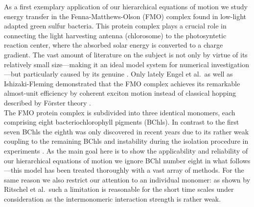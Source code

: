 As a first exemplary application of our hierarchical equations of motion we study energy transfer in the Fenna-Matthews-Olson (FMO) complex found in low-light adapted green sulfur bacteria.
This protein complex plays a crucial role in connecting the light harvesting antenna (chlorosome) to the photosyntetic reaction center, where the absorbed solar energy is converted to a charge gradient.
The vast amount of literature on the subject is not only by virtue of its relatively small size---making it an ideal model system for numerical investigation---but particularly caused by its genuine .
Only lately Engel et al.\ as well as Ishizaki-Fleming demonstrated that the FMO complex achieves its remarkable almost-unit efficiency by coherent exciton motion instead of classical hopping described by Förster theory \cite{EnCaRe07_fmo,IsFl09_fmo}. \\



The FMO protein complex is subdivided into three identical monomers, each comprising eight bacteriochlorophyll pigments (BChls).
In contrast to the first seven BChls the eighth was only discovered in recent years due to its rather weak coupling to the remaining BChls and instability during the isolation procedure in experiments \cite{TrCaBl09_fmo_structure,ScMuEl10_eighth}.
As the main goal here is to show the applicability and reliability of our hierarchical equations of motion we ignore BChl number eight in what follows---this model has been treated thoroughly with a vast array of methods.
For the same reason we also restrict our attention to an individual monomer: as shown by Ritschel et al.\ such a limitation is reasonable for the short time scales under consideration as the intermonomeric interaction strength is rather weak.

